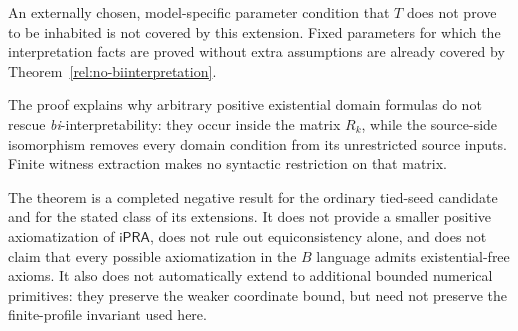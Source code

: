 An externally chosen, model-specific parameter condition that $T$ does
not prove to be inhabited is not covered by this extension. Fixed
parameters for which the interpretation facts are proved without extra
assumptions are already covered by Theorem~\ref{rel:no-biinterpretation}.

The proof explains why arbitrary positive existential domain formulas
do not rescue \emph{bi}-interpretability: they occur inside the matrix
$R_k$, while the source-side isomorphism removes every domain condition
from its unrestricted source inputs. Finite witness extraction makes no
syntactic restriction on that matrix.

The theorem is a completed negative result for the ordinary tied-seed
candidate and for the stated class of its extensions. It does not
provide a smaller positive axiomatization of $\mathsf{iPRA}$, does not
rule out equiconsistency alone, and does not claim that every possible
axiomatization in the $B$ language admits existential-free axioms.
It also does not automatically extend to additional bounded numerical
primitives: they preserve the weaker coordinate bound, but need not
preserve the finite-profile invariant used here.

